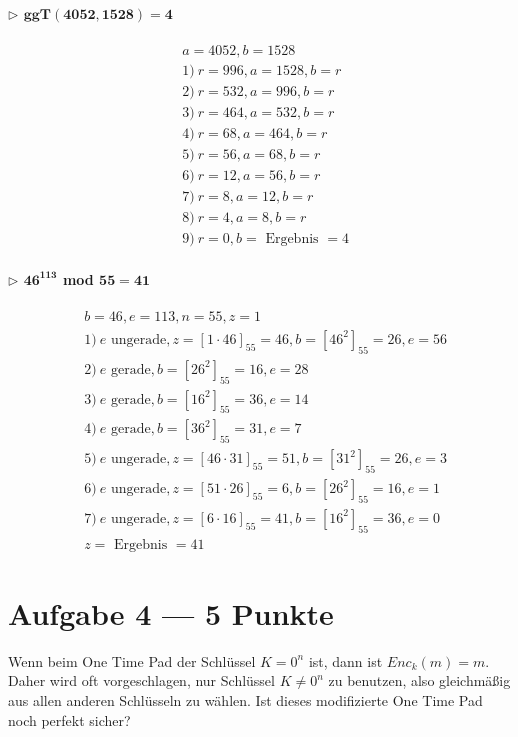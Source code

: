 \documentclass{../crypto_2}
\begin{document}
\paragraph{$\triangleright$ $\mathbf{ggT(4052,1528) = 4}$}
\begin{align*}
& a = 4052, b = 1528 \\
& 1) ~ r = 996, a = 1528, b = r \\
& 2) ~ r = 532, a = 996, b = r \\
& 3) ~ r= 464, a = 532, b = r \\
& 4) ~ r= 68, a = 464, b = r \\
& 5) ~ r= 56, a = 68, b= r\\
& 6) ~ r= 12, a= 56, b=r\\
& 7) ~ r= 8, a= 12, b =r \\
& 8) ~ r= 4, a=8, b=r \\ 
& 9) ~ r= 0, b = \text{ Ergebnis } = 4
\end{align*}
\paragraph{$\triangleright$ $\mathbf{46^{113}}$ mod $\mathbf{55 = 41}$}
\begin{align*}
& b = 46, e = 113, n = 55, z = 1 \\
&1) ~e \text{ ungerade}, z= [1\cdot 46]_{55} = 46, b = [46^2]_{55} = 26, e = 56 \\
& 2) ~e \text{ gerade}, b = [26^2]_{55} = 16, e = 28 \\
& 3) ~e \text{ gerade}, b = [16^2]_{55} = 36, e = 14 \\
& 4) ~e \text{ gerade}, b = [36^2]_{55} = 31, e = 7 \\
& 5) ~e \text{ ungerade}, z= [46\cdot 31]_{55} = 51, b= [31^2]_{55} = 26, e = 3 \\
& 6) ~e \text{ ungerade}, z = [51\cdot 26]_{55} = 6, b = [26^2]_{55} = 16, e = 1 \\
& 7) ~e \text{ ungerade}, z = [6\cdot 16]_{55} = 41, b = [16^2]_{55} = 36, e= 0 \\
& z = \text{ Ergebnis } = 41
\end{align*}

\section*{Aufgabe 4 --- 5 Punkte}
Wenn beim One Time Pad der Schlüssel $K=0^n$ ist, dann ist $Enc_k(m) = m$. Daher wird oft vorgeschlagen, nur Schlüssel $K\neq 0^n$ zu benutzen, also gleichmäßig aus allen anderen Schlüsseln zu wählen. Ist dieses modifizierte One Time Pad noch perfekt sicher? 
\end{document}
